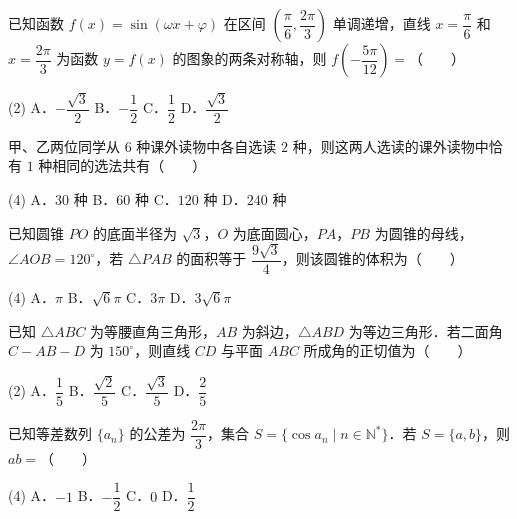 \begin{question}
已知函数 $f(x)=\sin(\omega x+\varphi)$ 在区间 $\left(\dfrac\pi6,\dfrac{2\pi}3\right)$ 单调递增，直线 $x=\dfrac\pi6$ 和 $x=\dfrac{2\pi}3$ 为函数 $y=f(x)$ 的图象的两条对称轴，则 $f\left(-\dfrac{5\pi}{12}\right)=$\mbox{（　　）}

\begin{gkopts}(2)
\task A．$-\dfrac{\sqrt3}{2}$
\task B．$-\dfrac12$
\task C．$\dfrac12$
\task D．$\dfrac{\sqrt3}{2}$
\end{gkopts}

\end{question}
\begin{question}
甲、乙两位同学从 $6$ 种课外读物中各自选读 $2$ 种，则这两人选读的课外读物中恰有 $1$ 种相同的选法共有\mbox{（　　）}

\begin{gkopts}(4)
\task A．$30$ 种
\task B．$60$ 种
\task C．$120$ 种
\task D．$240$ 种
\end{gkopts}

\end{question}
\begin{question}
已知圆锥 $PO$ 的底面半径为 $\sqrt3$，$O$ 为底面圆心，$PA$，$PB$ 为圆锥的母线，$\angle AOB=120^\circ$，若 $\triangle PAB$ 的面积等于 $\dfrac{9\sqrt3}{4}$，则该圆锥的体积为\mbox{（　　）}

\begin{gkopts}(4)
\task A．$\pi$
\task B．$\sqrt6\pi$
\task C．$3\pi$
\task D．$3\sqrt6\pi$
\end{gkopts}

\end{question}
\begin{question}
已知 $\triangle ABC$ 为等腰直角三角形，$AB$ 为斜边，$\triangle ABD$ 为等边三角形．若二面角 $C-AB-D$ 为 $150^\circ$，则直线 $CD$ 与平面 $ABC$ 所成角的正切值为\mbox{（　　）}

\begin{gkopts}(2)
\task A．$\dfrac15$
\task B．$\dfrac{\sqrt2}{5}$
\task C．$\dfrac{\sqrt3}{5}$
\task D．$\dfrac25$
\end{gkopts}

\end{question}
\begin{question}
已知等差数列 $\{a_n\}$ 的公差为 $\dfrac{2\pi}{3}$，集合 $S=\{\cos a_n\mid n\in\mathbb N^*\}$．若 $S=\{a,b\}$，则 $ab=$\mbox{（　　）}

\begin{gkopts}(4)
\task A．$-1$
\task B．$-\dfrac12$
\task C．$0$
\task D．$\dfrac12$
\end{gkopts}

\end{question}
